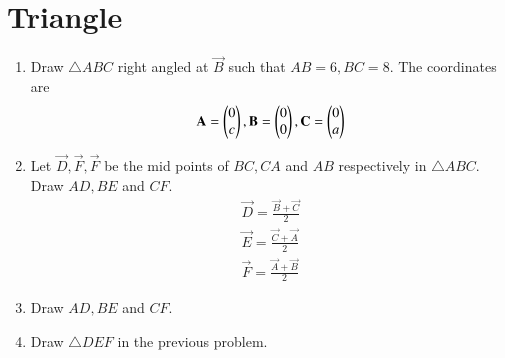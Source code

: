 \documentclass[journal,12pt,twocolumn]{IEEEtran}
\renewcommand\thesection{\arabic{section}}
\begin{document}
\section{Triangle}
\begin{enumerate}[label=\thesection.\arabic*
,ref=\thesection.\theenumi]
%
\item Draw $\triangle ABC$  right angled at $\vec{B}$ such that $AB = 6, BC =8$.
\solution The coordinates are
\begin{align}
\label{eq:rt_tang_pair}
\mathbf{A}=\begin{pmatrix}0 \\ c\end{pmatrix}
,
\mathbf{B}=\begin{pmatrix}0 \\ 0\end{pmatrix}
,
\mathbf{C}=\begin{pmatrix}0 \\ a\end{pmatrix}
\end{align}
\item Let $\vec{D}, \vec{F}, \vec{F}$ be the mid points of $BC,CA$ and $AB$ respectively in $\triangle ABC$. Draw $AD,BE$ and $CF$.
\\
\solution 
\begin{align}
\label{eq:rt_tang_pair}
\vec{D} = \frac{\vec{B}+\vec{C}}{2}
\\
\vec{E} = \frac{\vec{C}+\vec{A}}{2}
\\
\vec{F} = \frac{\vec{A}+\vec{B}}{2}
\end{align}
\item  Draw $AD, BE$ and $CF$.
\item Draw $\triangle DEF$ in the previous problem.
\end{enumerate}
\end{document}
